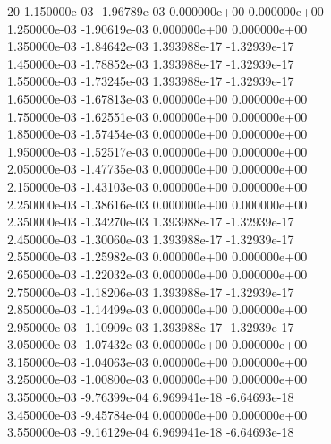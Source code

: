 20	1.150000e-03	-1.96789e-03	0.000000e+00	0.000000e+00	\\ 	1.250000e-03	-1.90619e-03	0.000000e+00	0.000000e+00	\\ 	1.350000e-03	-1.84642e-03	1.393988e-17	-1.32939e-17	\\ 	1.450000e-03	-1.78852e-03	1.393988e-17	-1.32939e-17	\\ 	1.550000e-03	-1.73245e-03	1.393988e-17	-1.32939e-17	\\ 	1.650000e-03	-1.67813e-03	0.000000e+00	0.000000e+00	\\ 	1.750000e-03	-1.62551e-03	0.000000e+00	0.000000e+00	\\ 	1.850000e-03	-1.57454e-03	0.000000e+00	0.000000e+00	\\ 	1.950000e-03	-1.52517e-03	0.000000e+00	0.000000e+00	\\ 	2.050000e-03	-1.47735e-03	0.000000e+00	0.000000e+00	\\ 	2.150000e-03	-1.43103e-03	0.000000e+00	0.000000e+00	\\ 	2.250000e-03	-1.38616e-03	0.000000e+00	0.000000e+00	\\ 	2.350000e-03	-1.34270e-03	1.393988e-17	-1.32939e-17	\\ 	2.450000e-03	-1.30060e-03	1.393988e-17	-1.32939e-17	\\ 	2.550000e-03	-1.25982e-03	0.000000e+00	0.000000e+00	\\ 	2.650000e-03	-1.22032e-03	0.000000e+00	0.000000e+00	\\ 	2.750000e-03	-1.18206e-03	1.393988e-17	-1.32939e-17	\\ 	2.850000e-03	-1.14499e-03	0.000000e+00	0.000000e+00	\\ 	2.950000e-03	-1.10909e-03	1.393988e-17	-1.32939e-17	\\ 	3.050000e-03	-1.07432e-03	0.000000e+00	0.000000e+00	\\ 	3.150000e-03	-1.04063e-03	0.000000e+00	0.000000e+00	\\ 	3.250000e-03	-1.00800e-03	0.000000e+00	0.000000e+00	\\ 	3.350000e-03	-9.76399e-04	6.969941e-18	-6.64693e-18	\\ 	3.450000e-03	-9.45784e-04	0.000000e+00	0.000000e+00	\\ 	3.550000e-03	-9.16129e-04	6.969941e-18	-6.64693e-18	\\ \hline
